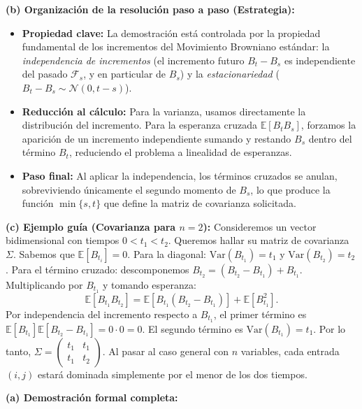 \documentclass[11pt, letterpaper]{article}
\begin{document}
\begin{solucion}
    \textbf{(b) Organización de la resolución paso a paso (Estrategia):}
    \begin{itemize}
        \item[(i)] \textbf{Propiedad clave:} La demostración está controlada por la propiedad fundamental de los incrementos del Movimiento Browniano estándar: la \textit{independencia de incrementos} (el incremento futuro $B_t - B_s$ es independiente del pasado $\mathcal{F}_s$, y en particular de $B_s$) y la \textit{estacionariedad} ($B_t - B_s \sim \mathcal{N}(0, t-s)$).
        \item[(ii)] \textbf{Reducción al cálculo:} Para la varianza, usamos directamente la distribución del incremento. Para la esperanza cruzada $\mathbb{E}[B_t B_s]$, forzamos la aparición de un incremento independiente sumando y restando $B_s$ dentro del término $B_t$, reduciendo el problema a linealidad de esperanzas.
        \item[(iii)] \textbf{Paso final:} Al aplicar la independencia, los términos cruzados se anulan, sobreviviendo únicamente el segundo momento de $B_s$, lo que produce la función $\min\{s,t\}$ que define la matriz de covarianza solicitada.
    \end{itemize}

    \vspace{3mm}
    \textbf{(c) Ejemplo guía (Covarianza para $n=2$):}
    Consideremos un vector bidimensional con tiempos $0 < t_1 < t_2$. 
    Queremos hallar su matriz de covarianza $\Sigma$. Sabemos que $\mathbb{E}[B_{t_i}] = 0$.
    Para la diagonal: $\text{Var}(B_{t_1}) = t_1$ y $\text{Var}(B_{t_2}) = t_2$.
    Para el término cruzado: descomponemos $B_{t_2} = (B_{t_2} - B_{t_1}) + B_{t_1}$.
    Multiplicando por $B_{t_1}$ y tomando esperanza:
    \[ \mathbb{E}[B_{t_1} B_{t_2}] = \mathbb{E}[B_{t_1}(B_{t_2} - B_{t_1})] + \mathbb{E}[B_{t_1}^2]. \]
    Por independencia del incremento respecto a $B_{t_1}$, el primer término es $\mathbb{E}[B_{t_1}]\mathbb{E}[B_{t_2} - B_{t_1}] = 0 \cdot 0 = 0$. El segundo término es $\text{Var}(B_{t_1}) = t_1$. 
    Por lo tanto, $\Sigma = \begin{pmatrix} t_1 & t_1 \\ t_1 & t_2 \end{pmatrix}$. Al pasar al caso general con $n$ variables, cada entrada $(i,j)$ estará dominada simplemente por el menor de los dos tiempos.

    \vspace{3mm}
    \textbf{(a) Demostración formal completa:}
    

\end{solucion}
\end{document}
